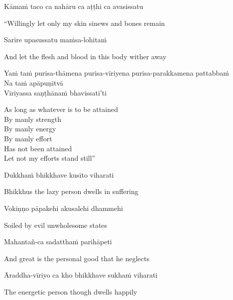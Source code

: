 Kāmaṁ taco ca nahāru ca aṭṭhi ca avasissatu

\begin{cprenglish}
  “Willingly let only my skin  sinews  and bones remain
\end{cprenglish}

Sarīre upasussatu maṁsa-lohitaṁ

\begin{cprenglish}
  And let the flesh and blood in this body wither away
\end{cprenglish}

Yaṁ taṁ purisa-thāmena purisa-vīriyena purisa-parakkamena pattabbaṁ\\
Na taṁ apāpuṇitvā\\
Vīriyassa saṇṭhānaṁ bhavissatī’ti

\begin{cprenglish}
  As long as whatever is to be attained\\
  By manly strength\\
  By manly energy\\
  By manly effort\\
  Has not been attained\\
  Let not my efforts stand still”
\end{cprenglish}

Dukkhaṁ bhikkhave kusīto viharati

\begin{cprenglish}
  Bhikkhus the lazy person dwells in suffering
\end{cprenglish}

Vokiṇṇo pāpakehi akusalehi dhammehi

\begin{cprenglish}
  Soiled by evil unwholesome states
\end{cprenglish}

Mahantañ-ca sadatthaṁ parihāpeti

\begin{cprenglish}
  And great is the personal good that he neglects
\end{cprenglish}

Āraddha-vīriyo ca kho bhikkhave sukhaṁ viharati

\begin{cprenglish}
  The energetic person though dwells happily
\end{cprenglish}

